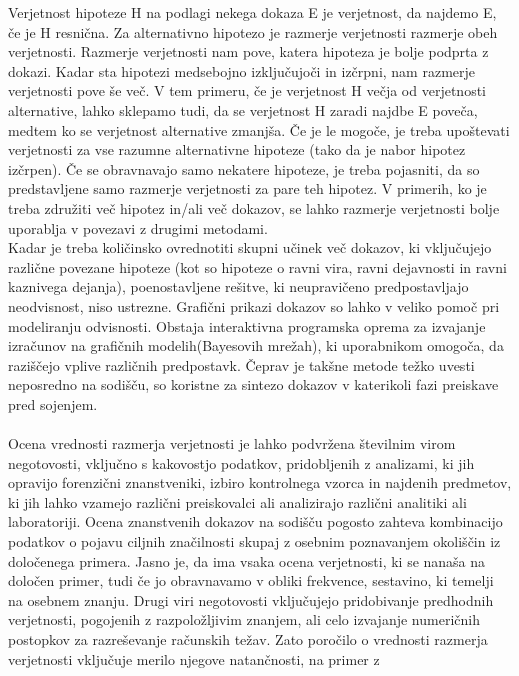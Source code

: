 \documentclass[12pt,a4paper]{amsart}
\theoremstyle{definition} %
\theoremstyle{plain} %
\begin{document}
Verjetnost hipoteze H na podlagi nekega dokaza E je verjetnost, da najdemo E, če je H resnična. Za alternativno hipotezo je razmerje verjetnosti razmerje obeh
verjetnosti. Razmerje verjetnosti nam pove, katera hipoteza je bolje podprta z dokazi. Kadar sta hipotezi medsebojno izključujoči in izčrpni, nam razmerje verjetnosti pove še več.
V tem primeru, če je verjetnost H večja od verjetnosti alternative, lahko sklepamo tudi, da se verjetnost H zaradi najdbe E poveča, medtem ko se
verjetnost alternative zmanjša. Če je le mogoče, je treba upoštevati verjetnosti za vse razumne alternativne hipoteze (tako da je nabor hipotez
izčrpen). Če se obravnavajo samo nekatere hipoteze, je treba pojasniti, da so predstavljene samo razmerje verjetnosti za pare teh hipotez. V primerih, ko je treba
združiti več hipotez in/ali več dokazov, se lahko razmerje verjetnosti bolje uporablja v povezavi z drugimi metodami.\\
Kadar je treba količinsko ovrednotiti skupni učinek več dokazov, ki vključujejo različne povezane hipoteze (kot so hipoteze o ravni vira, ravni
dejavnosti in ravni kaznivega dejanja), poenostavljene rešitve, ki neupravičeno predpostavljajo neodvisnost, niso ustrezne. Grafični prikazi dokazov
so lahko v veliko pomoč pri modeliranju odvisnosti. Obstaja interaktivna programska oprema za izvajanje izračunov na grafičnih modelih(Bayesovih mrežah),
ki uporabnikom omogoča, da raziščejo vplive različnih predpostavk. Čeprav je takšne metode težko uvesti neposredno na sodišču, so koristne za sintezo
dokazov v katerikoli fazi preiskave pred sojenjem.\\\\
Ocena vrednosti razmerja verjetnosti je lahko podvržena številnim virom negotovosti, vključno s kakovostjo podatkov, pridobljenih z analizami, ki jih
opravijo forenzični znanstveniki, izbiro kontrolnega vzorca in najdenih predmetov, ki jih lahko vzamejo različni preiskovalci ali analizirajo različni
analitiki ali laboratoriji. Ocena znanstvenih dokazov na sodišču pogosto zahteva kombinacijo podatkov o pojavu ciljnih značilnosti skupaj z osebnim poznavanjem
okoliščin iz določenega primera. Jasno je, da ima vsaka ocena verjetnosti, ki se nanaša na določen primer, tudi če jo obravnavamo v obliki frekvence, sestavino,
ki temelji na osebnem znanju. Drugi viri negotovosti vključujejo pridobivanje predhodnih verjetnosti, pogojenih z razpoložljivim znanjem, ali celo
izvajanje numeričnih postopkov za razreševanje računskih težav. Zato poročilo o vrednosti razmerja verjetnosti vključuje merilo njegove natančnosti, na primer z
\end{document}
